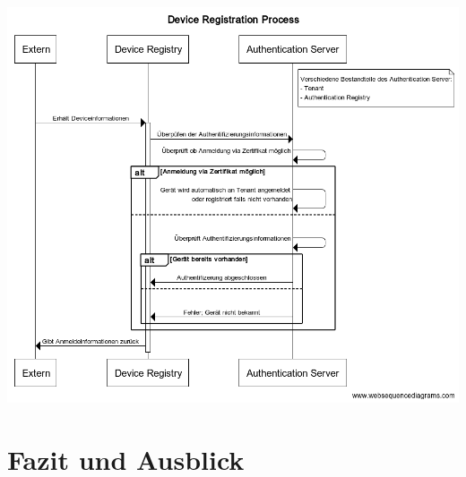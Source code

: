 \documentclass[
	12pt,
	BCOR=5mm,
	DIV=12,
	headinclude=on,
	footinclude=off,
	parskip=half,
	bibliography=totoc,
	listof=entryprefix,
	toc=listof,
	numbers=noenddot,
	plainfootsepline
]{scrreprt}
\begin{document}
\includegraphics[width=1.0\linewidth]{img/device_registration.png}





\chapter{Fazit und Ausblick}

\clearpage
\ihead{}
\printbibliography[title=Literaturverzeichnis]
\cleardoublepage

\end{document}
